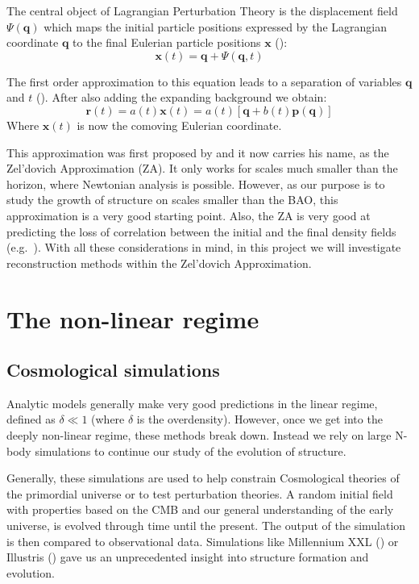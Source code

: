 The central object of Lagrangian Perturbation Theory is the displacement field $\Psi(\textbf{q})$ which maps the initial particle positions expressed by the Lagrangian coordinate $\textbf{q}$ to the final Eulerian particle positions $\textbf{x}$ (\cite{Bernardeau_PT}):
\begin{equation}
     \textbf{x}(t) = \textbf{q} + \Psi(\textbf{q}, t)
\end{equation}

The first order approximation to this equation leads to a separation of variables $\textbf{q}$ and $t$ (\cite{1993sfu..book.....P}). After also adding the expanding background we obtain:
\begin{equation}
    \textbf{r}(t) = a(t) \textbf{x}(t) = a(t) [\textbf{q} + b(t) \textbf{p}(\textbf{q})]
    \label{eq:2.2}
\end{equation}
Where $\textbf{x}(t)$ is now the comoving Eulerian coordinate.

This approximation was first proposed by \cite{1970A&A.....5...84Z} and it now carries his name, as the Zel'dovich Approximation (ZA). It only works for scales much smaller than the horizon, where Newtonian analysis is possible. However, as our purpose is to study the growth of structure on scales smaller than the BAO, this approximation is a very good starting point. Also, the ZA is very good at predicting the loss of correlation between the initial and the final density fields (e.g.~\cite{2016PhRvD..93j3519P}). With all these considerations in mind, in this project we will investigate reconstruction methods within the Zel'dovich Approximation.

\section{The non-linear regime}

\subsection{Cosmological simulations}
Analytic models generally make very good predictions in the linear regime, defined as $\delta \ll 1$ (where $\delta$ is the overdensity). However, once we get into the deeply non-linear regime, these methods break down. Instead we rely on large N-body simulations to continue our study of the evolution of structure.

Generally, these simulations are used to help constrain Cosmological theories of the primordial universe or to test perturbation theories. A random initial field with properties based on the CMB and our general understanding of the early universe, is evolved through time until the present. The output of the simulation is then compared to observational data. Simulations like Millennium XXL (\cite{Millennium_XXL}) or Illustris (\cite{Illustris_sim}) gave us an unprecedented insight into structure formation and evolution.

